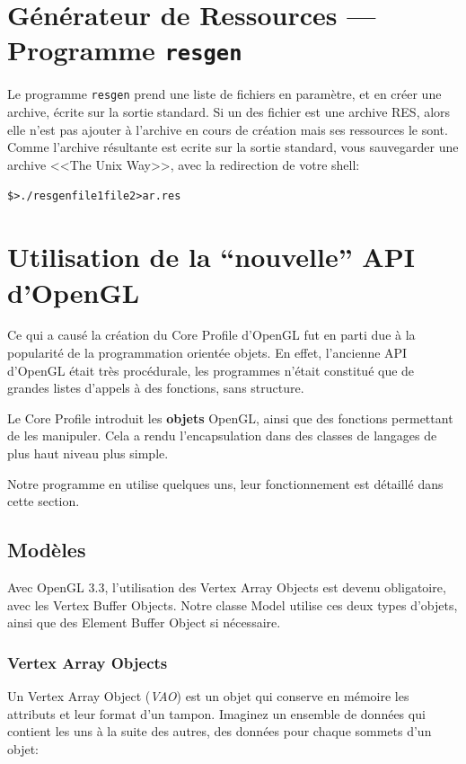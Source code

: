 \documentclass[pdftex, 11pt, a4paper, titlepage]{article}
\begin{document}
\section{Générateur de Ressources --- Programme \texttt{resgen}}

Le programme \texttt{resgen} prend une liste de fichiers en paramètre,
et en créer une archive, écrite sur la sortie standard.  Si un des
fichier est une archive RES, alors elle n'est pas ajouter à l'archive
en cours de création mais ses ressources le sont.  Comme l'archive
résultante est ecrite sur la sortie standard, vous sauvegarder une
archive <<The Unix Way>>, avec la redirection de votre shell:
 
\begin{alltt}
\$> ./resgen file1 file2 > ar.res
\end{alltt}

\section{Utilisation de la ``nouvelle'' API d'OpenGL}

Ce qui a causé la création du Core Profile d'OpenGL fut en parti due à
la popularité de la programmation orientée objets.  En effet,
l'ancienne API d'OpenGL était très procédurale, les programmes n'était
constitué que de grandes listes d'appels à des fonctions, sans
structure.

Le Core Profile introduit les \textbf{objets} OpenGL, ainsi que des
fonctions permettant de les manipuler. Cela a rendu l'encapsulation dans
des classes de langages de plus haut niveau plus simple.

Notre programme en utilise quelques uns, leur fonctionnement est
détaillé dans cette section.

\subsection{Modèles}

Avec OpenGL 3.3, l'utilisation des Vertex Array Objects est devenu
obligatoire, avec les Vertex Buffer Objects.  Notre classe Model
utilise ces deux types d'objets, ainsi que des Element Buffer Object
si nécessaire.

\subsubsection{Vertex Array Objects}

Un Vertex Array Object (\emph{VAO}) est un objet qui conserve en mémoire les
attributs et leur format d'un tampon.  Imaginez un ensemble de données
qui contient les uns à la suite des autres, des données pour chaque
sommets d'un objet:
\end{document}
